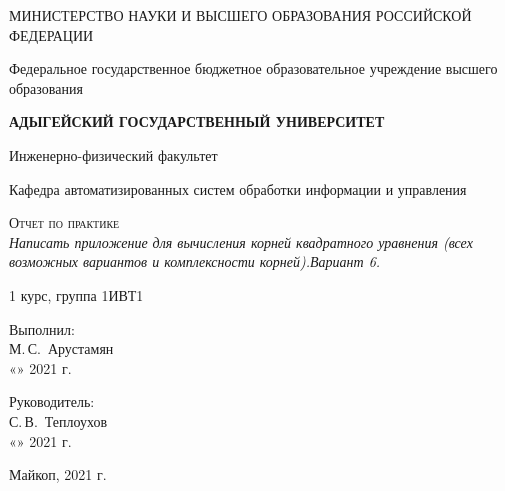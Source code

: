 \documentclass[12pt,a4paper]{scrartcl}
\begin{document}
	\begin{titlepage}
		\begin{center}
			\large
			МИНИСТЕРСТВО НАУКИ И ВЫСШЕГО ОБРАЗОВАНИЯ РОССИЙСКОЙ ФЕДЕРАЦИИ
			
			Федеральное государственное бюджетное образовательное учреждение высшего образования
			
			\textbf{АДЫГЕЙСКИЙ ГОСУДАРСТВЕННЫЙ УНИВЕРСИТЕТ}
			\vspace{0.25cm}
			
			Инженерно-физический факультет
			
			Кафедра автоматизированных систем обработки информации и управления
			\vfill

			\vfill
			
			\textsc{Отчет по практике}\\[5mm]
			
			{\LARGE \textit{Написать приложение для вычисления корней квадратного уравнения (всех возможных вариантов и комплексности корней).Вариант 6.}}
			\bigskip
			
			1 курс, группа 1ИВТ1
		\end{center}
		\vfill
		
		\newlength{\ML}
		\hfill\begin{minipage}{0.5\textwidth}
			Выполнил:\\
			\underline{\hspace{\ML}} М.\,С.~Арустамян\\
			«\underline{\hspace{0.7cm}}» \underline{\hspace{2cm}} 2021 г.
		\end{minipage}%
		\bigskip
		
		\hfill\begin{minipage}{0.5\textwidth}
			Руководитель:\\
			\underline{\hspace{\ML}} С.\,В.~Теплоухов\\
			«\underline{\hspace{0.7cm}}» \underline{\hspace{2cm}} 2021 г.
		\end{minipage}%
		\vfill
		
		\begin{center}
			Майкоп, 2021 г.
		\end{center}
	\end{titlepage}
\end{document}
